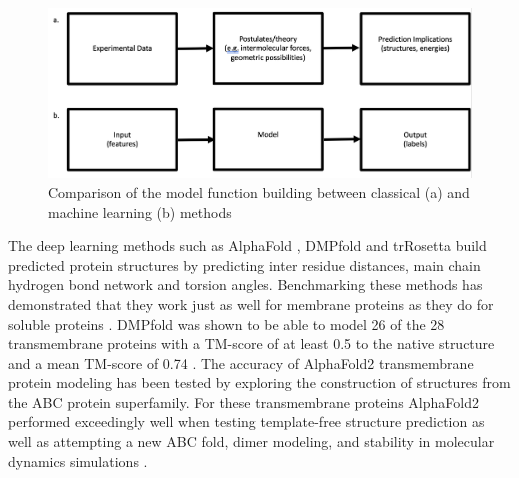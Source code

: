 \begin{figure}[th!]
    \centering
    \includegraphics[width=\textwidth]{introduction/model_building.png}
    \caption{Comparison of the model function building between classical (a) and machine learning (b) methods}
    \label{fig:model_building}
    \small
\end{figure}

The deep learning methods such as AlphaFold \cite{Jumper2021}, DMPfold \cite{Greener2019} and trRosetta \cite{yan2021accurate} build predicted protein structures by predicting inter residue distances, main chain hydrogen bond network and torsion angles.  Benchmarking these methods has demonstrated that they work just as well for membrane proteins as they do for soluble proteins \cite{Greener2019,hegedHus2021alphafold2}.  DMPfold was shown to be able to model 26 of the 28 transmembrane proteins with a TM-score of at least 0.5 to the native structure and a mean TM-score of 0.74 \cite{Greener2019}.  The accuracy of AlphaFold2 transmembrane protein modeling has been tested by exploring the construction of structures from the ABC protein superfamily. For these transmembrane proteins AlphaFold2 performed exceedingly well when testing template-free structure prediction as well as attempting a new ABC fold, dimer modeling, and stability in molecular dynamics simulations \cite{hegedHus2021alphafold2}.  


